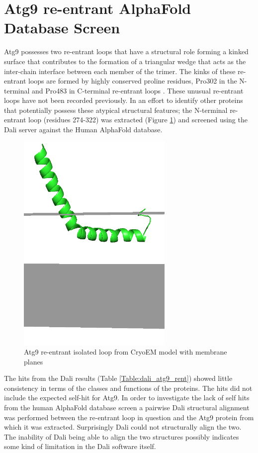 \fi



\section{Atg9 re-entrant AlphaFold Database Screen}

Atg9 possesses two re-entrant loops that have a structural role forming a kinked surface that contributes to the formation of a triangular wedge that acts as the inter-chain interface between each member of the trimer. The kinks of these re-entrant loops are formed by highly conserved proline residues, Pro302 in the N-terminal and Pro483 in C-terminal re-entrant loops \cite{guardia2020structure}.   These unusual re-entrant loops have not been recorded previously.  In an effort to identify other proteins that potentially possess these atypical structural features; the N-terminal re-entrant loop (residues 274-322) was extracted (Figure \ref{fig:atg9_rent}) and screened using the Dali server against the Human AlphaFold database. 

\begin{figure}[th!]
    \centering
    \includegraphics[width=75mm, scale=0.75]{Pfam/atg9_rent.png}
    \caption{Atg9 re-entrant isolated loop from CryoEM model with membrane planes}
    \label{fig:atg9_rent}
    \small
\end{figure}

The hits from the Dali results (Table  \ref{Table:dali_atg9_rent}) showed little consistency in terms of the classes and functions of the proteins.  The hits did not include the expected self-hit for Atg9.  In order to investigate the lack of self hits from the human AlphaFold database screen a pairwise Dali structural alignment was performed between the re-entrant loop in question and the Atg9 protein from which it was extracted.  Surprisingly Dali could not structurally align the two.  The inability of Dali being able to align the two structures possibly indicates some kind of limitation in the Dali software itself.  

